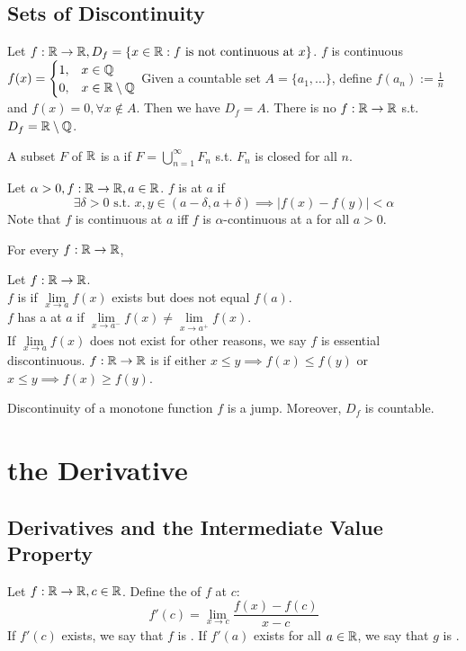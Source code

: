 \documentclass[11pt]{article}
\begin{document}
\subsection{Sets of Discontinuity}
Let $f: \mathbb{R} \rightarrow \mathbb{R}, D_f = \{x \in \mathbb{R}: f \text{ is not continuous at }x\}$.
\example[$D_f = \emptyset$] $f$ is continuous
\example[$D_f = \real$] $f(x) = \begin{cases}
	1, & x\in \mathbb{Q}\\
	0, & x \in \mathbb{R} \setminus \mathbb{Q}
\end{cases} $
\example Given a countable set $A = \{a_1, \hdots\}$, define $f(a_n) := \frac{1}{n}$ and $f(x) = 0, \forall x \notin A$. Then we have $D_f = A$.
\fact There is no $f: \mathbb{R} \rightarrow \mathbb{R}$ s.t. $D_f = \mathbb{R} \setminus \mathbb{Q}$.

 A subset $F$ of $\mathbb{R}$ is a  if $F = \bigcup_{n=1}^\infty F_n$ s.t. $F_n$ is closed for all $n$.

 Let $\alpha > 0, f:\mathbb{R} \rightarrow \mathbb{R}, a \in \mathbb{R}$. $f$ is  at $a$ if
$$\exists \delta > 0 \text{ s.t. } x, y \in (a - \delta, a + \delta) \implies |f(x) - f(y)| < \alpha$$
Note that $f$ is continuous at $a$ iff $f$ is $\alpha$-continuous at a for all $a > 0$.

\property For every $f: \mathbb{R} \rightarrow \mathbb{R}$, 

 Let $f: \mathbb{R} \rightarrow \mathbb{R}$. \\
$f$ is  if $\underset{x \rightarrow a}{\lim} f(x)$ exists but does not equal $f(a)$.\\
$f$ has a  at $a$ if $\underset{x \rightarrow a^-}{\lim} f(x) \neq \underset{x \rightarrow a^+}{\lim} f(x)$. \\
If $\underset{x \rightarrow a}{\lim} f(x)$ does not exist for other reasons, we say $f$ is essential discontinuous.
 $f: \mathbb{R} \rightarrow \mathbb{R}$ is  if either $x \leq y \implies f(x) \leq f(y)$ or $x \leq y \implies f(x) \geq f(y)$.

\property
Discontinuity of a monotone function $f$ is a jump. Moreover, $D_f$ is countable.

\section{the Derivative}
\subsection{Derivatives and the Intermediate Value Property}
Let $f: \mathbb{R} \rightarrow \mathbb{R}, c \in \mathbb{R}$. Define the  of $f$ at $c$:
$$f'(c) = \underset{x \rightarrow c}{\lim} \frac{f(x) - f(c)}{x - c}$$
If $f'(c)$ exists, we say that $f$ is . If $f'(a)$ exists for all $a \in \mathbb{R}$, we say that $g$ is .
\end{document}
